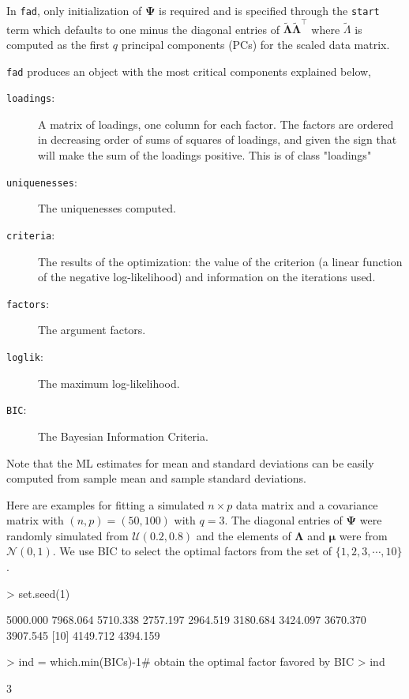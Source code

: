 \documentclass{article}
\begin{document}
In \texttt{fad}, only initialization of $\bm{\Psi}$ is required and is specified through the \texttt{start} term which defaults to one minus the diagonal entries of $\bm{\tilde\Lambda}\bm{\tilde\Lambda}^{\top}$ where $\tilde\Lambda$ is computed as the first $q$ principal components (PCs) for the scaled data matrix. 

\texttt{fad} produces an object with the most critical components explained below,
\begin{description}
\item[\texttt{loadings}:] A matrix of loadings, one column for each factor. The factors are ordered in decreasing order of sums of squares of loadings, and given the sign that will make the sum of the loadings positive. This is of class "loadings"
\item[\texttt{uniquenesses}:]	The uniquenesses computed.
\item[\texttt{criteria}:]	The results of the optimization: the value of the criterion (a linear function of the negative log-likelihood) and information on the iterations used.
\item[\texttt{factors}:] The argument factors.
\item[\texttt{loglik}:] The maximum log-likelihood.
\item[\texttt{BIC}:] The Bayesian Information Criteria.
\end{description}
Note that the ML estimates for mean and standard deviations can be easily computed from sample mean and sample standard deviations.

Here are examples for fitting a simulated $n\times p$ data matrix and a covariance matrix with $(n,p) = (50,100)$ with $q=3$. The diagonal entries of $\bm{\Psi}$ were randomly simulated from $\mathcal{U}(0.2,0.8)$ and the elements of $\bm{\Lambda}$ and $\bm{\mu}$ were from $\mathcal{N}(0,1)$. We use BIC to select the optimal factors from the set of $\{1,2,3,\cdots,10\}$.
\begin{Schunk}
\begin{Sinput}
> set.seed(1)
\end{Sinput}
\end{Schunk}
\begin{Schunk}
\begin{Soutput}
 [1] 5000.000 7968.064 5710.338 2757.197 2964.519 3180.684 3424.097 3670.370 3907.545
[10] 4149.712 4394.159
\end{Soutput}
\begin{Sinput}
> ind = which.min(BICs)-1# obtain the optimal factor favored by BIC
> ind
\end{Sinput}
\begin{Soutput}
[1] 3
\end{Soutput}
\end{Schunk}
\end{document}
